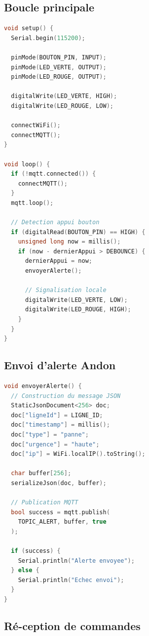 \subsection{Boucle principale}

\begin{lstlisting}[language=C++,
caption={Boucle principale (loop)},
label={lst:loop_esp32}]
void setup() {
  Serial.begin(115200);
  
  pinMode(BOUTON_PIN, INPUT);
  pinMode(LED_VERTE, OUTPUT);
  pinMode(LED_ROUGE, OUTPUT);
  
  digitalWrite(LED_VERTE, HIGH);
  digitalWrite(LED_ROUGE, LOW);
  
  connectWiFi();
  connectMQTT();
}

void loop() {
  if (!mqtt.connected()) {
    connectMQTT();
  }
  mqtt.loop();
  
  // Detection appui bouton
  if (digitalRead(BOUTON_PIN) == HIGH) {
    unsigned long now = millis();
    if (now - dernierAppui > DEBOUNCE) {
      dernierAppui = now;
      envoyerAlerte();
      
      // Signalisation locale
      digitalWrite(LED_VERTE, LOW);
      digitalWrite(LED_ROUGE, HIGH);
    }
  }
}
\end{lstlisting}

\subsection{Envoi d'alerte Andon}

\begin{lstlisting}[language=C++,
caption={Fonction d'envoi d'alerte},
label={lst:envoyer_alerte_esp32}]
void envoyerAlerte() {
  // Construction du message JSON
  StaticJsonDocument<256> doc;
  doc["ligneId"] = LIGNE_ID;
  doc["timestamp"] = millis();
  doc["type"] = "panne";
  doc["urgence"] = "haute";
  doc["ip"] = WiFi.localIP().toString();
  
  char buffer[256];
  serializeJson(doc, buffer);
  
  // Publication MQTT
  bool success = mqtt.publish(
    TOPIC_ALERT, buffer, true
  );
  
  if (success) {
    Serial.println("Alerte envoyee");
  } else {
    Serial.println("Echec envoi");
  }
}
\end{lstlisting}

\subsection{R\'e-ception de commandes}

